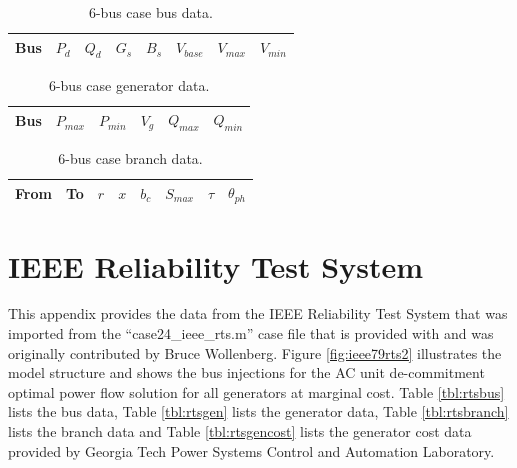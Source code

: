 
\begin{table}[h]
\caption{6-bus case bus data.}
\label{tbl:case6ww_bus}
\begin{center}
\begin{tabular}{c|c|c|c|c|c|c|c}
\hline
Bus &$P_d$ &$Q_d$ &$G_s$ &$B_s$ &$V_{base}$ &$V_{max}$ &$V_{min}$\\
\hline\hline

\hline
\end{tabular}
\end{center}
\end{table}

\begin{table}[h]
\caption{6-bus case generator data.}
\label{tbl:case6ww_gen}
\begin{center}
\begin{tabular}{c|c|c|c|c|c}
\hline
Bus &$P_{max}$ &$P_{min}$ &$V_g$ &$Q_{max}$ &$Q_{min}$\\
\hline\hline

\hline
\end{tabular}
\end{center}
\end{table}

\begin{table}[h]
\caption{6-bus case branch data.}
\label{tbl:case6ww_branch}
\begin{center}
\begin{tabular}{c|c|c|c|c|c|c|c}
\hline
From &To &$r$ &$x$ &$b_c$ &$S_{max}$ &$\tau$ &$\theta_{ph}$\\
\hline\hline

\hline
\end{tabular}
\end{center}
\end{table}

\section{IEEE Reliability Test System}
\label{adx:ieee_rts}
This appendix provides the data from the IEEE Reliability Test System
\cite{ieee79rts} that was imported from the ``case24\_ieee\_rts.m'' case file
that is provided with \matpower and was originally contributed by Bruce
Wollenberg.  Figure \ref{fig:ieee79rts2} illustrates the model structure and
shows the bus injections for the AC unit de-commitment optimal power flow
solution for all generators at marginal cost.  Table \ref{tbl:rtsbus} lists the
bus data, Table \ref{tbl:rtsgen} lists the generator data, Table
\ref{tbl:rtsbranch} lists the branch data and Table \ref{tbl:rtsgencost} lists
the generator cost data provided by Georgia Tech Power Systems Control and
Automation Laboratory.

